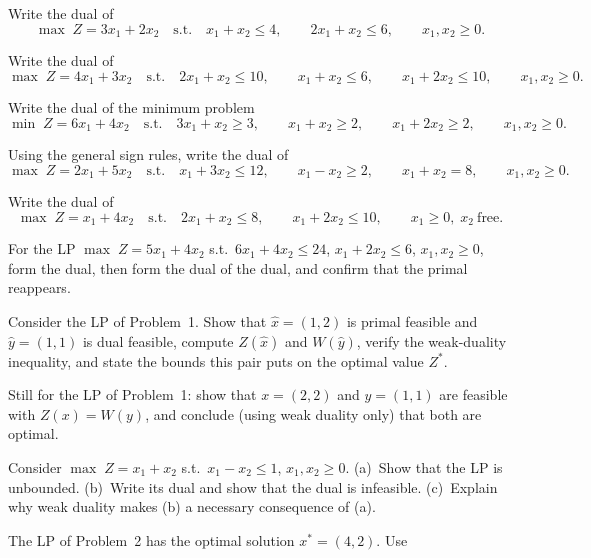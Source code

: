 \begin{problems}
  \item Write the dual of
        \[
          \max\; Z=3x_{1}+2x_{2}
          \quad\text{s.t.}\quad
          x_{1}+x_{2}\le 4,\qquad 2x_{1}+x_{2}\le 6,\qquad
          x_{1},x_{2}\ge 0 .
        \]
  \item Write the dual of
        \[
          \max\; Z=4x_{1}+3x_{2}
          \quad\text{s.t.}\quad
          2x_{1}+x_{2}\le 10,\qquad x_{1}+x_{2}\le 6,\qquad
          x_{1}+2x_{2}\le 10,\qquad x_{1},x_{2}\ge 0 .
        \]
  \item Write the dual of the minimum problem
        \[
          \min\; Z=6x_{1}+4x_{2}
          \quad\text{s.t.}\quad
          3x_{1}+x_{2}\ge 3,\qquad x_{1}+x_{2}\ge 2,\qquad
          x_{1}+2x_{2}\ge 2,\qquad x_{1},x_{2}\ge 0 .
        \]
  \item Using the general sign rules, write the dual of
        \[
          \max\; Z=2x_{1}+5x_{2}
          \quad\text{s.t.}\quad
          x_{1}+3x_{2}\le 12,\qquad x_{1}-x_{2}\ge 2,\qquad
          x_{1}+x_{2}= 8,\qquad x_{1},x_{2}\ge 0 .
        \]
  \item Write the dual of
        \[
          \max\; Z=x_{1}+4x_{2}
          \quad\text{s.t.}\quad
          2x_{1}+x_{2}\le 8,\qquad x_{1}+2x_{2}\le 10,\qquad
          x_{1}\ge 0,\; x_{2}\ \text{free}.
        \]
  \item For the LP
        $\max\; Z=5x_{1}+4x_{2}$ s.t.\ $6x_{1}+4x_{2}\le 24$,
        $x_{1}+2x_{2}\le 6$, $x_{1},x_{2}\ge 0$, form the dual, then form
        the dual of the dual, and confirm that the primal reappears.
  \item Consider the LP of Problem~1. Show that $\hat{x}=(1,2)$ is primal
        feasible and $\hat{y}=(1,1)$ is dual feasible, compute
        $Z(\hat{x})$ and $W(\hat{y})$, verify the weak-duality inequality,
        and state the bounds this pair puts on the optimal value $Z^{*}$.
  \item Still for the LP of Problem~1: show that $x=(2,2)$ and $y=(1,1)$
        are feasible with $Z(x)=W(y)$, and conclude (using weak duality
        only) that both are optimal.
  \item Consider
        $\max\; Z=x_{1}+x_{2}$ s.t.\ $x_{1}-x_{2}\le 1$,
        $x_{1},x_{2}\ge 0$.
        (a)~Show that the LP is unbounded.
        (b)~Write its dual and show that the dual is infeasible.
        (c)~Explain why weak duality makes (b) a necessary consequence of
        (a).
  \item The LP of Problem~2 has the optimal solution $x^{*}=(4,2)$. Use

\end{problems}
